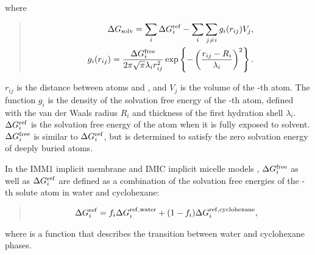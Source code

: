 \documentclass[a4paper,11pt,oneside,english]{sphinxmanual}
\begin{document}
where
\begin{quote}

\vspace{-5mm}
\begin{align*}\!\begin{aligned}
\Delta {G_{{\rm{solv}}}} = \sum\limits_i {\Delta {G_i^{{\rm{ref}}}}} - \sum\limits_i {\sum\limits_{j \neq i} {g_i(r_{ij})V_j}},\\
g_i(r_{ij}) = {\frac{\Delta {G_i^{{\rm{free}}}}}{2\pi \sqrt{\pi} \lambda_i r_{ij}^2}} \exp \left\{ - \left( {\frac{r_{ij} - R_i}{\lambda_i}} \right)^2 \right\}.\\
\end{aligned}\end{align*}
\vspace{-3mm}
\end{quote}

\(r_{ij}\) is the distance between atoms  and , and \(V_{j}\) is the volume
of the -th atom. The function \(g_{i}\) is the density of the solvation free energy of the -th atom,
defined with the van der Waals radius \(R_{i}\) and thickness of the first hydration shell \(\lambda_{i}\).
\(\Delta {G_i^{{\rm{ref}}}}\) is the solvation free energy of the atom when it is fully exposed to solvent.
\(\Delta {G_i^{{\rm{free}}}}\) is similar to \(\Delta {G_i^{{\rm{ref}}}}\),
but is determined to satisfy the zero solvation energy of deeply buried atoms.

In the IMM1 implicit membrane  and IMIC implicit micelle models ,
\(\Delta {G_i^{{\rm{free}}}}\) as well as \(\Delta {G_i^{{\rm{ref}}}}\) are defined as a combination
of the solvation free energies of the -th solute atom in water and cyclohexane:
\begin{quote}

\vspace{-5mm}
\begin{equation*}
\begin{split}\Delta {G_i^{{\rm{ref}}}} &= f_i \Delta {G_i^{{\rm{ref,water}}}} + (1 - f_i) \Delta {G_i^{{\rm{ref,cyclohexane}}}},\end{split}
\end{equation*}
\vspace{-3mm}
\end{quote}

where  is a function that describes the transition between water and cyclohexane phases.
\end{document}
